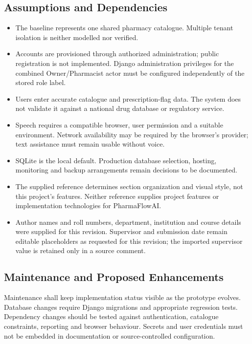 \documentclass[11pt,a4paper]{article}
\newcommand{\Project}{PharmaFlowAI}
\begin{document}
\subsection{Assumptions and Dependencies}
\begin{itemize}
\item The baseline represents one shared pharmacy catalogue. Multiple tenant isolation is neither modelled nor verified.
\item Accounts are provisioned through authorized administration; public registration is not implemented. Django administration privileges for the combined Owner/Pharmacist actor must be configured independently of the stored role label.
\item Users enter accurate catalogue and prescription-flag data. The system does not validate it against a national drug database or regulatory service.
\item Speech requires a compatible browser, user permission and a suitable environment. Network availability may be required by the browser's provider; text assistance must remain usable without voice.
\item SQLite is the local default. Production database selection, hosting, monitoring and backup arrangements remain decisions to be documented.
\item The supplied reference determines section organization and visual style, not this project's features. Neither reference supplies project features or implementation technologies for \Project.
\item Author names and roll numbers, department, institution and course details were supplied for this revision. Supervisor and submission date remain editable placeholders as requested for this revision; the imported supervisor value is retained only in a source comment.
\end{itemize}

\subsection{Maintenance and Proposed Enhancements}
Maintenance shall keep implementation status visible as the prototype evolves. Database changes require Django migrations and appropriate regression tests. Dependency changes should be tested against authentication, catalogue constraints, reporting and browser behaviour. Secrets and user credentials must not be embedded in documentation or source-controlled configuration.
\end{document}
